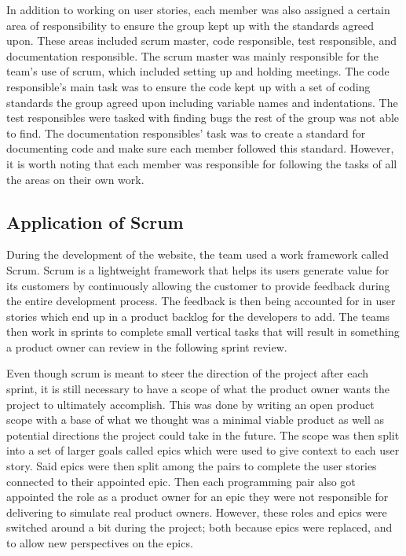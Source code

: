 In addition to working on user stories, each member was also assigned a certain area of responsibility to ensure the group kept up with the standards agreed upon. These areas included scrum master, code responsible, test responsible, and documentation responsible. The scrum master was mainly responsible for the team’s use of scrum, which included setting up and holding meetings. The code responsible’s main task was to ensure the code kept up with a set of coding standards the group agreed upon including variable names and indentations. The test responsibles were tasked with finding bugs the rest of the group was not able to find. The documentation responsibles’ task was to create a standard for documenting code and make sure each member followed this standard. However, it is worth noting that each member was responsible for following the tasks of all the areas on their own work. 

\subsection{Application of Scrum}
During the development of the website, the team used a work framework called Scrum. Scrum is a lightweight framework that helps its users generate value for its customers by continuously allowing the customer to provide feedback during the entire development process. The feedback is then being accounted for in user stories which end up in a product backlog for the developers to add. The teams then work in sprints to complete small vertical tasks that will result in something a product owner can review in the following sprint review.

Even though scrum is meant to steer the direction of the project after each sprint, it is still necessary to have a scope of what the product owner wants the project to ultimately accomplish. This was done by writing an open product scope with a base of what we thought was a minimal viable product as well as potential directions the project could take in the future. The scope was then split into a set of larger goals called epics which were used to give context to each user story. Said epics were then split among the pairs to complete the user stories connected to their appointed epic. Then each programming pair also got appointed the role as a product owner for an epic they were not responsible for delivering to simulate real product owners. However, these roles and epics were switched around a bit during the project; both because epics were replaced, and to allow new perspectives on the epics. 

